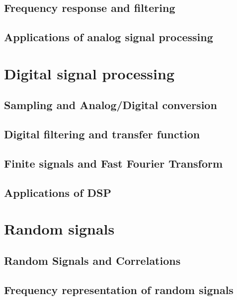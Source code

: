 \documentclass[a4paper, 10pt, dvipsnames]{book}
\begin{document}
\section{Frequency response and filtering}
\label{sec:freq-response}
\section{Applications of analog signal processing}
\label{sec:appli-ft}

\chapter{Digital signal processing}
\label{chap:dsp}


\section{Sampling and Analog/Digital conversion}
\label{sec:sampling}

\section{Digital filtering and transfer function}
\label{sec:digital_filtering}

\section{Finite signals and Fast Fourier Transform}
\label{sec:finite_signals_fft}

\section{Applications of DSP}
\label{sec:applis_dsp}

\chapter{Random signals}
\label{chap:random}


\section{Random Signals and Correlations}
\label{sec:rand_sig_corr}

\section{Frequency representation of random signals}
\label{sec:freq_resp_random}
\end{document}

